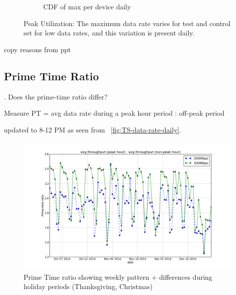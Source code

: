 \begin{figure}[ht!]
\begin{minipage}{0.45\linewidth}
\begin{subfigure}[b]{0.45\linewidth}
  \caption{CDF of max per device daily}
  \vspace{1em}
  \label{fig:CDF-data-rate-max-daily}
\end{subfigure}
\end{minipage}
\caption{Peak Utilization: The maximum data rate varies for test and control set for low data rates, and this variation is present daily.}
\label{fig:peak-utilization}
\end{figure}

copy reasons from ppt



\subsection{Prime Time Ratio}
\label{subsec:prime-time}

. Does the prime-time ratio differ?

Measure PT = avg data rate during a peak hour period : off-peak period

updated to 8-12 PM as seen from ~\ref{fig:TS-data-rate-daily}.




\begin{figure}[ht!]
\begin{minipage}{0.45\linewidth}
\centering
\includegraphics[width=0.45\linewidth]{figures/prime-time-ratio-by-date[replace].png}
\caption{Prime Time ratio showing weekly pattern + differences during holiday periods (Thanksgiving, Christmas)}
\label{fig:TS-prime-time-ratio}
\end{minipage}
\end{figure}

